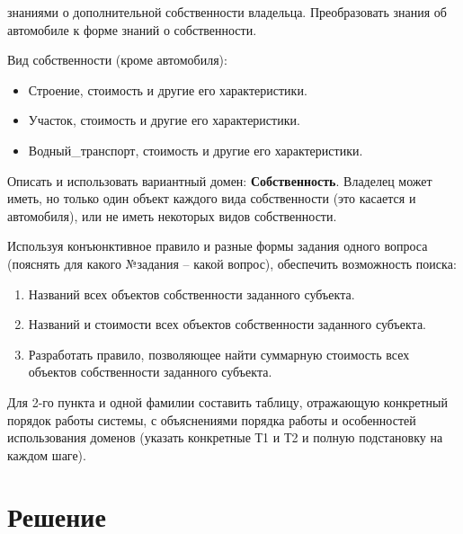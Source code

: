 \documentclass[12pt]{report}
\begin{document}
знаниями о дополнительной собственности владельца. Преобразовать знания об автомобиле к форме знаний о собственности.

Вид собственности (кроме автомобиля):

\begin{itemize}
	\item Строение, стоимость и другие его характеристики.
	\item Участок, стоимость и другие его характеристики.
	\item Водный\_транспорт, стоимость и другие его характеристики.
\end{itemize}

Описать и использовать вариантный домен: \textbf{Собственность}. Владелец может иметь, но только один объект каждого вида собственности (это касается и автомобиля), или не иметь некоторых видов собственности. 

Используя конъюнктивное правило и разные формы задания одного вопроса (пояснять для какого №задания – какой вопрос), обеспечить возможность поиска:

\begin{enumerate}
	\item Названий всех объектов собственности заданного субъекта.
	\item Названий и стоимости всех объектов собственности заданного субъекта.
	\item Разработать правило, позволяющее найти суммарную стоимость всех объектов собственности заданного субъекта.
\end{enumerate}

Для 2-го пункта и одной фамилии составить таблицу, отражающую конкретный порядок работы системы, с объяснениями порядка работы и особенностей использования доменов  (указать конкретные Т1 и Т2 и полную подстановку на каждом шаге).

\newpage
\section*{Решение}
\end{document}
